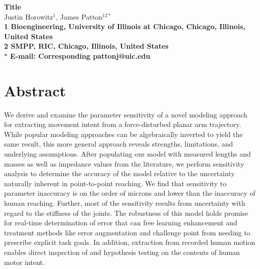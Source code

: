 \documentclass[10pt]{article}
\date{}
\begin{document}
\begin{flushleft}
{\Large
\textbf{Title}
}
\\
Justin Horowitz$^{1}$, 
James Patton$^{12\ast}$
\\
\bf{1} Bioengineering, University of Illinois at Chicago, Chicago, Illinois, United States
\\
\bf{2} SMPP, RIC, Chicago, Illinois, United States
\\
$\ast$ E-mail: Corresponding pattonj@uic.edu
\end{flushleft}

\section*{Abstract}
We derive and examine the parameter sensitivity of a novel modeling approach for extracting movement intent from a force-disturbed planar arm trajectory. While popular modeling approaches can be algebraically inverted to yield the same result, this more general approach reveals strengths, limitations, and underlying assumptions. After populating our model with measured lengths and masses as well as impedance values from the literature, we perform sensitivity analysis to determine the accuracy of the model relative to the uncertainty naturally inherent in point-to-point reaching. We find that sensitivity to parameter inaccuracy is on the order of microns and lower than the inaccuracy of human reaching. Further, most of the sensitivity results from uncertainty with regard to the stiffness of the joints. The robustness of this model holds promise for real-time determination of error that can free learning enhancement and treatment methods like error augmentation and challenge point from needing to prescribe explicit task goals. In addition, extraction from recorded human motion enables direct inspection of and hypothesis testing on the contents of human motor intent.
\end{document}
